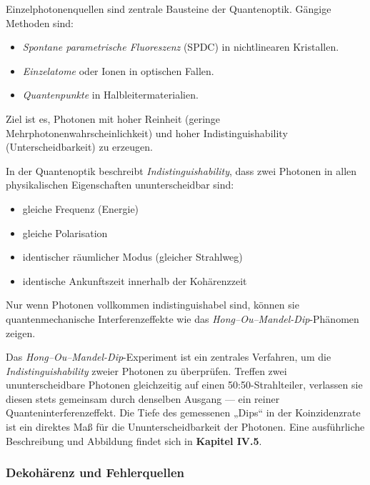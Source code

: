 Einzelphotonenquellen sind zentrale Bausteine der Quantenoptik. Gängige Methoden sind:
\begin{itemize}
	\item \emph{Spontane parametrische Fluoreszenz} (SPDC) in nichtlinearen Kristallen.
	\item \emph{Einzelatome} oder Ionen in optischen Fallen.
	\item \emph{Quantenpunkte} in Halbleitermaterialien.
\end{itemize}
Ziel ist es, Photonen mit hoher Reinheit (geringe Mehrphotonenwahrscheinlichkeit) und hoher Indistinguishability (Unterscheidbarkeit) zu erzeugen.
\medskip
\begin{tcolorbox}[hinweisbox, title=Was bedeutet „Indistinguishability“? \label{box:indistinguishability}]
	\small
	In der Quantenoptik beschreibt \emph{Indistinguishability}, dass zwei Photonen in allen physikalischen Eigenschaften ununterscheidbar sind:
	\begin{itemize}
		\item gleiche Frequenz (Energie)
		\item gleiche Polarisation
		\item identischer räumlicher Modus (gleicher Strahlweg)
		\item identische Ankunftszeit innerhalb der Kohärenzzeit
	\end{itemize}
	Nur wenn Photonen vollkommen indistinguishabel sind, können sie quantenmechanische Interferenzeffekte wie das \emph{Hong–Ou–Mandel-Dip}-Phänomen zeigen.
\end{tcolorbox}
\medskip
\begin{tcolorbox}[physikbox, title=Das Hong–Ou–Mandel-Dip-Phänomen \label{box:hong_ou_mandel}]
	\small
	Das \emph{Hong–Ou–Mandel-Dip}-Experiment ist ein zentrales Verfahren, um die \emph{Indistinguishability} zweier Photonen zu überprüfen. Treffen zwei ununterscheidbare Photonen gleichzeitig auf einen 50:50-Strahlteiler, verlassen sie diesen stets gemeinsam durch denselben Ausgang — ein reiner Quanteninterferenzeffekt.  
	Die Tiefe des gemessenen „Dips“ in der Koinzidenzrate ist ein direktes Maß für die Ununterscheidbarkeit der Photonen.  
	Eine ausführliche Beschreibung und Abbildung findet sich in \textbf{Kapitel IV.5}.
\end{tcolorbox}

\subsubsection{Dekohärenz und Fehlerquellen}

